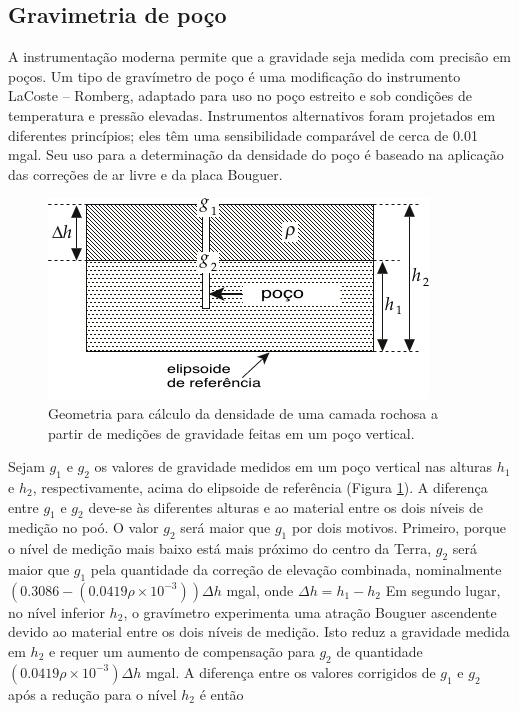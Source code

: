 \documentclass[]{book}
\theoremstyle{definition}
\theoremstyle{definition}
\theoremstyle{definition}
\theoremstyle{remark}
\begin{document}
\hypertarget{gravimetria-de-poco}{%
\subsection{Gravimetria de poço}\label{gravimetria-de-poco}}

A instrumentação moderna permite que a gravidade seja medida com precisão em poços. Um tipo de gravímetro de poço é uma modificação do instrumento LaCoste -- Romberg, adaptado para uso no poço estreito e sob condições de temperatura e pressão elevadas. Instrumentos alternativos foram projetados em diferentes princípios; eles têm uma sensibilidade comparável de cerca de 0.01 mgal. Seu uso para a determinação da densidade do poço é baseado na aplicação das correções de ar livre e da placa Bouguer.

\begin{figure}

{\centering \includegraphics[width=0.6\linewidth]{fig/Fig_02.34} 

}

\caption{Geometria para cálculo da densidade de uma camada rochosa a partir de medições de gravidade feitas em um poço vertical.}\label{fig:camada}
\end{figure}

Sejam \(g_1\) e \(g_2\) os valores de gravidade medidos em um poço vertical nas alturas \(h_1\) e \(h_2\), respectivamente, acima do elipsoide de referência (Figura \ref{fig:camada}). A diferença entre \(g_1\) e \(g_2\) deve-se às diferentes alturas e ao material entre os dois níveis de medição no poó. O valor \(g_2\) será maior que \(g_1\) por dois motivos. Primeiro, porque o nível de medição mais baixo está mais próximo do centro da Terra, \(g_2\) será maior que \(g_1\) pela quantidade da correção de elevação combinada, nominalmente \((0.3086 - (0.0419\rho \times 10^{-3}))\Delta h\) mgal, onde \(\Delta h= h_1-h_2\) Em segundo lugar, no nível inferior \(h_2\), o gravímetro experimenta uma atração Bouguer ascendente devido ao material entre os dois níveis de medição. Isto reduz a gravidade medida em \(h_2\) e requer um aumento de compensação para \(g_2\) de quantidade \((0.0419\rho\times 10^{-3})\Delta h\) mgal. A diferença entre os valores corrigidos de \(g_1\) e \(g_2\) após a redução para o nível \(h_2\) é então
\end{document}
